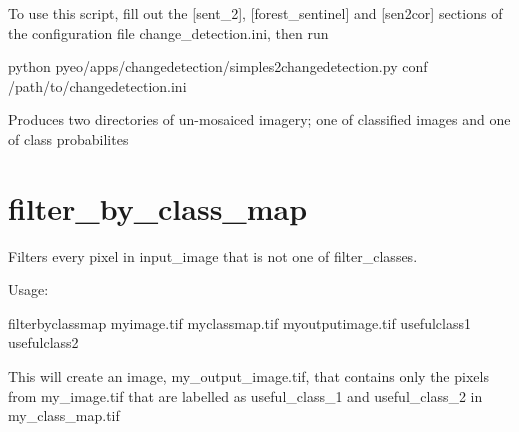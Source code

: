 \documentclass[letterpaper,10pt,english]{sphinxmanual}
\begin{document}
To use this script, fill out the {[}sent\_2{]}, {[}forest\_sentinel{]} and {[}sen2cor{]} sections of the configuration file
change\_detection.ini, then run

\begin{sphinxVerbatim}[commandchars=\\\{\}]
\PYGZdl{} python pyeo/apps/change\PYGZus{}detection/simple\PYGZus{}s2\PYGZus{}change\PYGZus{}detection.py \PYGZhy{}\PYGZhy{}conf /path/to/change\PYGZus{}detection.ini
\end{sphinxVerbatim}

Produces two directories of un-mosaiced imagery; one of classified images and one of class probabilites
\label{\detokenize{index:module-pyeo.apps.masking.filter_by_class_map}}

\section{filter\_by\_class\_map}
\label{\detokenize{index:filter-by-class-map}}
Filters every pixel in input\_image that is not one of filter\_classes.

Usage:

\begin{sphinxVerbatim}[commandchars=\\\{\}]
\PYGZdl{} filter\PYGZus{}by\PYGZus{}class\PYGZus{}map my\PYGZus{}image.tif my\PYGZus{}class\PYGZus{}map.tif my\PYGZus{}output\PYGZus{}image.tif useful\PYGZus{}class\PYGZus{}1 useful\PYGZus{}class\PYGZus{}2
\end{sphinxVerbatim}

This will create an image, my\_output\_image.tif, that contains only the pixels from my\_image.tif
that are labelled as useful\_class\_1 and useful\_class\_2 in my\_class\_map.tif
\label{\detokenize{index:module-pyeo.apps.model_creation.create_model_from_region}}
\end{document}
